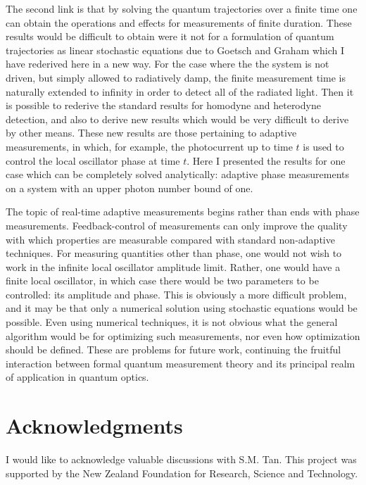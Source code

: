 \documentclass[12pt]{article}
\begin{document}
The second link is that by solving the quantum trajectories over a finite time
one can obtain the operations and effects for measurements of finite duration. These
results would be difficult to obtain were it not for a formulation of quantum
trajectories as linear stochastic \sch equations due to Goetsch and Graham which I
have rederived here in a new way. For the case where the the system is not driven, but 
simply allowed
to  radiatively damp, the finite measurement time is naturally extended to infinity in order to
detect all of the radiated light. Then it is possible to rederive the standard results for
homodyne and heterodyne detection, and also to derive new results which would
be very difficult to derive by other means. These new results are those
pertaining to adaptive measurements, in which, for example, the photocurrent up to
time $t$ is used to control the local oscillator phase at time $t$. Here I
presented the results for one case which can be completely solved analytically: adaptive phase
measurements on a system with an upper photon number bound of one.

The topic of real-time adaptive measurements begins rather than ends with phase
measurements. Feedback-control of measurements can only improve the quality with
which properties are measurable compared with standard non-adaptive techniques.
For measuring quantities other than phase, one would not wish to work in the
infinite local oscillator amplitude limit. Rather, one would have a finite local
oscillator, in which case there would be two parameters to be controlled: its
amplitude and phase. This is obviously a more difficult problem, and it may be
that only a numerical solution using stochastic \sch equations would be possible.
Even using numerical techniques, it is not obvious what the general algorithm
would be for optimizing such measurements, nor even how optimization should be
defined. These are problems for future work, continuing the fruitful interaction
between formal quantum measurement theory and its principal realm of application
in quantum optics.

\section*{Acknowledgments}

I would like to acknowledge valuable discussions with S.M. Tan.
This project was supported by the New Zealand Foundation for Research,
Science and Technology.
\end{document}
